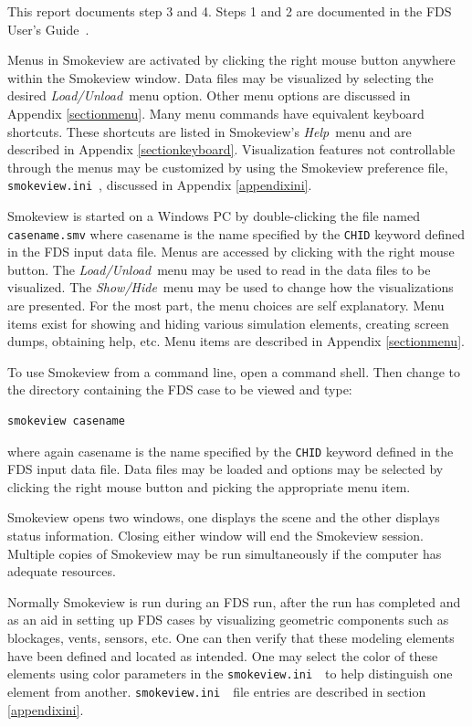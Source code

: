 \documentclass[11pt,twoside]{book}
\newcommand{\svini}{{\tt smokeview.ini}\ }
\begin{document}
\noindent This report documents step 3 and 4. Steps 1 and 2 are
documented in the FDS User's Guide~\cite{FDS_Users_Guide}.

Menus in Smokeview are activated by clicking the right mouse
button anywhere within the Smokeview window.  Data files may be
visualized by selecting the desired {\em Load/Unload}\ menu
option. Other menu options are discussed in Appendix
\ref{sectionmenu}. Many menu commands have equivalent keyboard
shortcuts. These shortcuts are listed in Smokeview's {\em Help}\
menu and are described in Appendix \ref{sectionkeyboard}.
Visualization features not controllable through the menus may be
customized by using the Smokeview preference file, \svini,
discussed in Appendix \ref{appendixini}.

Smokeview  is started on a Windows PC by double-clicking the file
named {\tt casename.smv} where casename is the name specified by
the {\tt CHID} keyword defined in the FDS input data file. Menus
are accessed by clicking with the right mouse button.  The {\em
Load/Unload}\ menu may be used to read in the data files to be
visualized. The {\em Show/Hide}\ menu may be used to change how
the visualizations are presented. For the most part, the menu
choices are self explanatory. Menu items exist for showing and
hiding various simulation elements, creating screen dumps,
obtaining help, etc. Menu items are described in Appendix
\ref{sectionmenu}.

To use Smokeview from a command line, open a command shell. Then
change to the directory containing the FDS case to be viewed and
type:
\begin{lstlisting}
smokeview casename
\end{lstlisting}
where again casename is the name specified by the {\tt CHID}
keyword defined in the FDS input data file. Data files may be
loaded and options may be selected by clicking the right mouse
button and picking the appropriate menu item.


Smokeview opens two windows, one displays the scene and the other
displays status information. Closing either window will end the
Smokeview session.  Multiple copies of Smokeview may be run
simultaneously if the computer has adequate resources.

Normally Smokeview is run during an FDS run, after the run has
completed and as an aid in setting up FDS cases by visualizing
geometric components such as blockages, vents, sensors, etc. One
can then verify that these modeling elements have been defined and
located as intended. One may select the color of these elements
using color parameters in the \svini\ to help distinguish one
element from another. \svini\ file entries are described in
section \ref{appendixini}.
\end{document}
